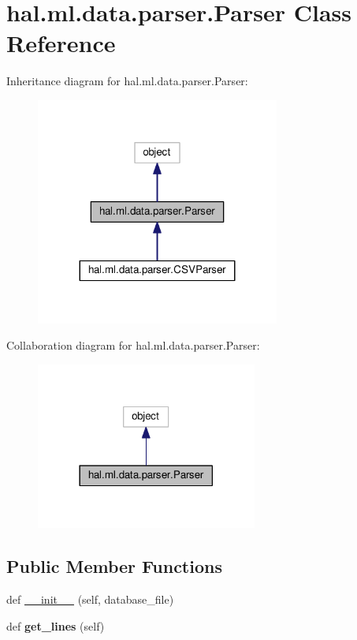 \hypertarget{classhal_1_1ml_1_1data_1_1parser_1_1_parser}{}\section{hal.\+ml.\+data.\+parser.\+Parser Class Reference}
\label{classhal_1_1ml_1_1data_1_1parser_1_1_parser}


Inheritance diagram for hal.\+ml.\+data.\+parser.\+Parser\+:
\nopagebreak
\begin{figure}[H]
\begin{center}
\leavevmode
\includegraphics[width=227pt]{classhal_1_1ml_1_1data_1_1parser_1_1_parser__inherit__graph}
\end{center}
\end{figure}


Collaboration diagram for hal.\+ml.\+data.\+parser.\+Parser\+:
\nopagebreak
\begin{figure}[H]
\begin{center}
\leavevmode
\includegraphics[width=206pt]{classhal_1_1ml_1_1data_1_1parser_1_1_parser__coll__graph}
\end{center}
\end{figure}
\subsection*{Public Member Functions}
\begin{DoxyCompactItemize}
\item 
def \hyperlink{classhal_1_1ml_1_1data_1_1parser_1_1_parser_adc7a4812823d9c636eb8977c6d450e6a}{\+\_\+\+\_\+init\+\_\+\+\_\+} (self, database\+\_\+file)
\item 
def {\bfseries get\+\_\+lines} (self)\hypertarget{classhal_1_1ml_1_1data_1_1parser_1_1_parser_aaf10b0c434100a1c3effd5e5ee0ee2a3}{}\label{classhal_1_1ml_1_1data_1_1parser_1_1_parser_aaf10b0c434100a1c3effd5e5ee0ee2a3}

\end{DoxyCompactItemize}
